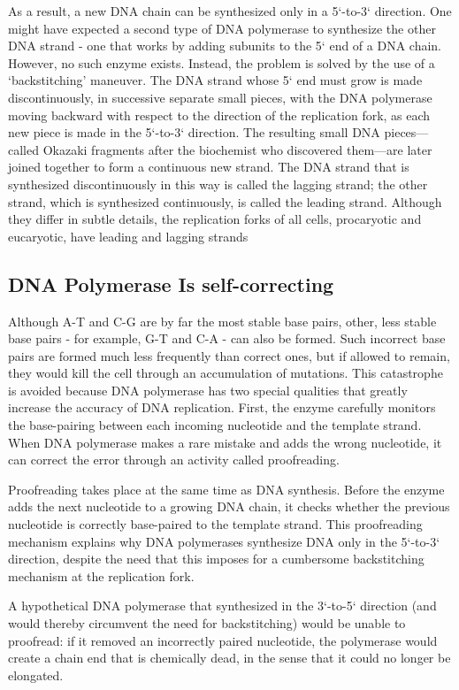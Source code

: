 As a result, a new DNA chain can be synthesized only
in a 5`-to-3` direction. One
might have expected a second type of DNA polymerase to synthesize the
other DNA strand - one that works by adding subunits to the 5` end of
a DNA chain. However, no such enzyme exists. Instead, the problem is
solved by the use of a ‘backstitching’ maneuver. The DNA strand whose
5` end must grow is made discontinuously, in successive separate small
pieces, with the DNA polymerase moving backward with respect to the
direction of the replication fork, as each new piece is made in the 5`-to-3`
direction.
The resulting small DNA pieces—called Okazaki fragments after the
biochemist who discovered them—are later joined together to form a
continuous new strand. The DNA strand that is synthesized
discontinuously in this way is called the lagging strand; the other strand,
which is synthesized continuously, is called the leading strand.
Although they differ in subtle details, the replication forks of all cells,
procaryotic and eucaryotic, have leading and lagging strands

\subsection{DNA Polymerase Is self-correcting}

Although A-T and C-G are by far the most stable base pairs, other, less
stable base pairs - for example, G-T and C-A - can also be formed. Such
incorrect base pairs are formed much less frequently than correct ones,
but if allowed to remain, they would kill the cell through an accumulation
of mutations. This catastrophe is avoided because DNA polymerase
has two special qualities that greatly increase the accuracy of DNA replication.
First, the enzyme carefully monitors the base-pairing between
each incoming nucleotide and the template strand.
When DNA polymerase makes a rare mistake and adds
the wrong nucleotide, it can correct the error through an activity called
proofreading.

Proofreading takes place at the same time as DNA synthesis. Before
the enzyme adds the next nucleotide to a growing DNA chain, it checks
whether the previous nucleotide is correctly base-paired to the template
strand. This proofreading mechanism explains why DNA polymerases synthesize
DNA only in the 5`-to-3` direction, despite the need that this imposes for a
cumbersome backstitching mechanism at the replication fork.

A hypothetical DNA polymerase that synthesized in the
3`-to-5` direction (and would thereby circumvent the need for backstitching)
would be unable to proofread: if it removed an incorrectly paired
nucleotide, the polymerase would create a chain end that is chemically
dead, in the sense that it could no longer be elongated.


